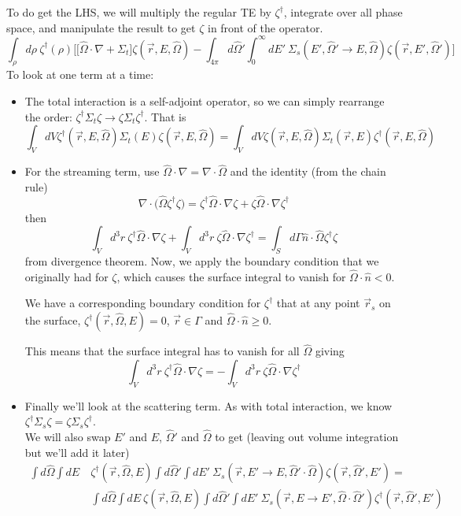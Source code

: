 \documentclass[12pt]{article}
\newcommand{\rvec}{\ensuremath{\vec{r}}}
\newcommand{\vOmega}{\ensuremath{\hat{\Omega}}}
\begin{document}
To do get the LHS, we will multiply the regular TE by $\zeta^{\dagger}$, integrate over all phase space, and manipulate the result to get $\zeta$ in front of the operator.
%
\[\int_{\rho} d\rho\: \zeta^{\dagger}(\rho)\biggl[ \bigl[\vOmega \cdot \nabla + \Sigma_t\bigr] \zeta(\vec{r}, E, \vOmega) - \int_{4 \pi} d\vOmega' \int_0^{\infty} dE' \: \Sigma_s(E', \vOmega' \rightarrow E, \vOmega) \zeta(\vec{r}, E', \vOmega') \biggr]\]
% 
To look at one term at a time:
\begin{itemize}
\item The total interaction is a self-adjoint operator, so we can simply rearrange the order: $\zeta^{\dagger} \Sigma_t \zeta \rightarrow \zeta \Sigma_t \zeta^{\dagger}$. That is
\[\int_V dV \zeta^{\dagger}(\vec{r}, E, \vOmega) \Sigma_t(E) \zeta(\vec{r}, E, \vOmega) = \int_V dV \zeta(\vec{r}, E, \vOmega) \Sigma_t(\rvec,E) \zeta^{\dagger}(\vec{r}, E, \vOmega)\]
%
\item For the streaming term, use $\vOmega \cdot \nabla = \nabla \cdot \vOmega$ and the identity (from the chain rule)
\[\nabla \cdot \bigl(\vOmega \zeta^{\dagger} \zeta \bigr) = \zeta^{\dagger}\vOmega \cdot \nabla \zeta + \zeta \vOmega \cdot \nabla \zeta^{\dagger}\]
then
\[
\int_V d^3r \:\zeta^{\dagger}\vOmega \cdot \nabla \zeta + \int_V d^3r \:\zeta \vOmega \cdot \nabla \zeta^{\dagger} = \int_S d \Gamma \hat{n} \cdot \vOmega \zeta^{\dagger} \zeta
\]
from divergence theorem. Now, we apply the boundary condition that we originally had for $\zeta$, which causes the surface integral to vanish for $\vOmega \cdot \hat{n} < 0$.

We have a corresponding boundary condition for $\zeta^{\dagger}$ that at any point $\rvec_s$ on the surface, $\zeta^{\dagger}(\rvec, \vOmega, E) = 0$, $\vec{r} \in \Gamma$ and $\vOmega \cdot \hat{n} \geq 0$.

This means that the surface integral has to vanish for all $\vOmega$ giving
\[
\int_V d^3r \:\zeta^{\dagger}\vOmega \cdot \nabla \zeta = -\int_V d^3r \:\zeta \vOmega \cdot \nabla \zeta^{\dagger}
\]
%
\item Finally we'll look at the scattering term. As with total interaction, we know $\zeta^{\dagger} \Sigma_s \zeta  = \zeta \Sigma_s \zeta^{\dagger}$. \\
We will also swap $E'$ and $E$, $\vOmega'$ and $\vOmega$ to get (leaving out volume integration but we'll add it later)
\begin{align*}
\int d\vOmega \int dE\: &\zeta^{\dagger}(\rvec, \vOmega, E) \int d\vOmega' \int dE'\: \Sigma_s(\rvec, E' \rightarrow E, \vOmega' \cdot \vOmega) \zeta(\rvec, \vOmega', E') = \\
%
&\int d\vOmega \int dE\: \zeta(\rvec, \vOmega, E) \int d\vOmega' \int dE'\: \Sigma_s(\rvec, E \rightarrow E', \vOmega \cdot \vOmega') \zeta^{\dagger}(\rvec, \vOmega', E') 
\end{align*}
\end{itemize}
\end{document}
